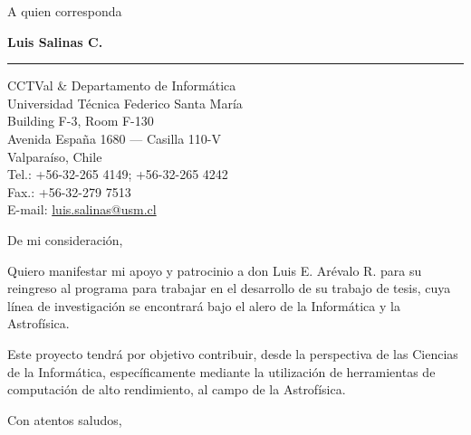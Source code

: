 \documentclass{letter} %
\begin{document}
\signature{Luis Salinas C.}           %
\longindentation=0pt                       %
\let\raggedleft\raggedright                %
 
 
\begin{letter}{A quien corresponda}

\begin{center}
{\large\bf Luis Salinas C.} 
\end{center}
\medskip\hrule height 1pt
\begin{center}
{CCTVal \& Departamento de Informática \\
  Universidad Técnica Federico Santa María \\
  Building F-3, Room F-130 \\
  Avenida España 1680 --- Casilla 110-V \\
  Valparaíso, Chile \\
  Tel.: +56-32-265 4149; +56-32-265 4242 \\
  Fax.: +56-32-279 7513 \\
  E-mail: \url{luis.salinas@usm.cl}}
\end{center} \vfill %
 
 
\opening{De mi consideración,} 
 
\noindent Quiero
manifestar mi apoyo y patrocinio a don Luis E. Arévalo R. para su
reingreso al programa para trabajar en el desarrollo de su trabajo de
tesis, cuya línea de investigación se encontrará bajo el alero de la Informática y la Astrofísica.
 
\noindent Este proyecto tendrá por objetivo contribuir, desde la perspectiva de las Ciencias de la Informática, específicamente mediante la utilización de herramientas de computación de alto rendimiento, al campo de la Astrofísica. 


\closing{Con atentos saludos,} 
 

 

\end{letter}
 
\end{document}
